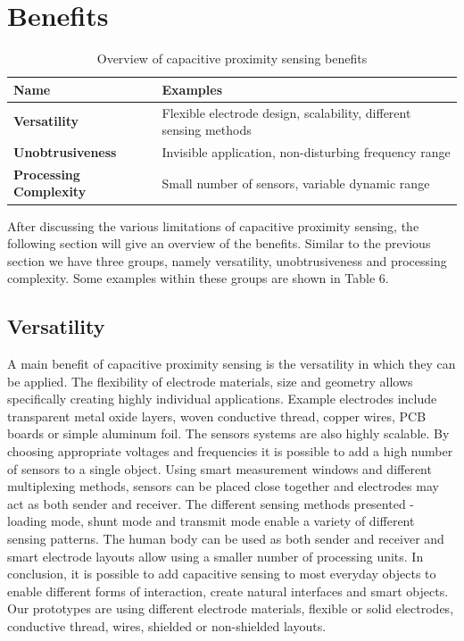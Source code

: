 \section{Benefits}
\begin{table}[htbp]
  \centering
  \caption{Overview of capacitive proximity sensing benefits}
    \begin{tabular}{p{4cm}p{6cm}}
    \toprule
    \textbf{Name} & \textbf{Examples} \\
    \midrule
    \textbf{Versatility} & Flexible electrode design, scalability, different sensing methods \\
    \textbf{Unobtrusiveness} & Invisible application, non-disturbing frequency range \\
    \textbf{Processing Complexity} & Small number of sensors, variable dynamic range \\
    \bottomrule
    \end{tabular}%
  \label{tab:cap_benefits}%
\end{table}%

After discussing the various limitations of capacitive proximity sensing, the following section will give an overview of the benefits.  Similar to the previous section we have three groups, namely versatility, unobtrusiveness and processing complexity. Some examples within these groups are shown in Table 6.
\subsection{Versatility}
A main benefit of capacitive proximity sensing is the versatility in which they can be applied. The flexibility of electrode materials, size and geometry allows specifically creating highly individual applications. Example electrodes include transparent metal oxide layers, woven conductive thread, copper wires, PCB boards or simple aluminum foil. 
The sensors systems are also highly scalable. By choosing appropriate voltages and frequencies it is possible to add a high number of sensors to a single object. Using smart measurement windows and different multiplexing methods, sensors can be placed close together and electrodes may act as both sender and receiver.
The different sensing methods presented - loading mode, shunt mode and transmit mode enable a variety of different sensing patterns. The human body can be used as both sender and receiver and smart electrode layouts allow using a smaller number of processing units. 
In conclusion, it is possible to add capacitive sensing to most everyday objects to enable different forms of interaction, create natural interfaces and smart objects. Our prototypes are using different electrode materials, flexible or solid electrodes, conductive thread, wires, shielded or non-shielded layouts. 
